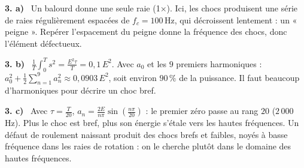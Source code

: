 \documentclass[a4paper,11pt]{article}
\newcommand{\q}[1]{\textbf{\color{uimmblue}#1}\ }
\begin{document}
\begin{correction}
\q{3. a)} Un balourd donne une seule raie (1×). Ici, les chocs produisent une série de raies régulièrement espacées de $f_c = 100$\,Hz, qui décroissent lentement : un « peigne ». Repérer l'espacement du peigne donne la fréquence des chocs, donc l'élément défectueux.

\q{3. b)} $\frac1T\int_0^T s^2 = \frac{E^2\tau}{T} = 0{,}1\,E^2$. Avec $a_0$ et les $9$ premiers harmoniques : $a_0^2 + \frac12\sum_{n=1}^{9}a_n^2\approx 0{,}0903\,E^2$, soit environ $90\,\%$ de la puissance. Il faut beaucoup d'harmoniques pour décrire un choc bref.

\q{3. c)} Avec $\tau = \frac{T}{20}$, $a_n = \frac{2E}{n\pi}\sin\left(\frac{n\pi}{20}\right)$ : le premier zéro passe au rang $20$ ($2\,000$\,Hz). Plus le choc est bref, plus son énergie s'étale vers les hautes fréquences. Un défaut de roulement naissant produit des chocs brefs et faibles, noyés à basse fréquence dans les raies de rotation : on le cherche plutôt dans le domaine des hautes fréquences.
\end{correction}
\end{document}
